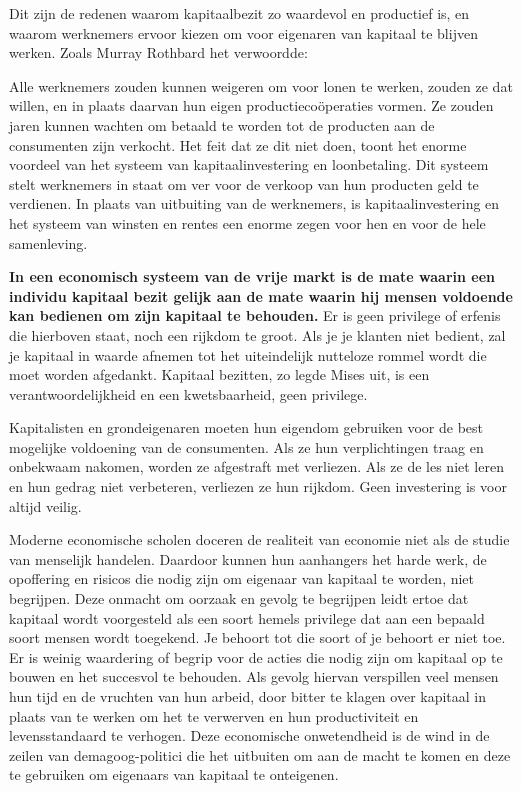 Dit zijn de redenen waarom kapitaalbezit zo waardevol en productief is, en waarom werknemers ervoor kiezen om voor eigenaren van kapitaal te blijven werken. Zoals Murray Rothbard het verwoordde:

\begin{blockquotebox}
    Alle werknemers zouden kunnen weigeren om voor lonen te werken, zouden ze dat willen, en in plaats daarvan hun eigen productiecoöperaties vormen. Ze zouden jaren kunnen wachten om betaald te worden tot de producten aan de consumenten zijn verkocht. Het feit dat ze dit niet doen, toont het enorme voordeel van het systeem van kapitaalinvestering en loonbetaling. Dit systeem stelt werknemers in staat om ver voor de verkoop van hun producten geld te verdienen. In plaats van uitbuiting van de werknemers, is kapitaalinvestering en het systeem van winsten en rentes een enorme zegen voor hen en voor de hele samenleving. \footnotemark
\end{blockquotebox}
\autocite{64}

\textbf{In een economisch systeem van de vrije markt is de mate waarin een individu kapitaal bezit gelijk aan de mate waarin hij mensen voldoende kan bedienen om zijn kapitaal te behouden.} Er is geen privilege of erfenis die hierboven staat, noch een rijkdom te groot. Als je je klanten niet bedient, zal je kapitaal in waarde afnemen tot het uiteindelijk nutteloze rommel wordt die moet worden afgedankt. Kapitaal bezitten, zo legde Mises uit, is een verantwoordelijkheid en een kwetsbaarheid, geen privilege.

\begin{blockquotebox}
    Kapitalisten en grondeigenaren moeten hun eigendom gebruiken voor de best mogelijke voldoening van de consumenten. Als ze hun verplichtingen traag en onbekwaam nakomen, worden ze afgestraft met verliezen. Als ze de les niet leren en hun gedrag niet verbeteren, verliezen ze hun rijkdom. Geen investering is voor altijd veilig. \footnotemark
\end{blockquotebox}
\autocite{65}

Moderne economische scholen doceren de realiteit van economie niet als de studie van menselijk handelen. Daardoor kunnen hun aanhangers het harde werk, de opoffering en risico\textquotesingle s die nodig zijn om eigenaar van kapitaal te worden, niet begrijpen. Deze onmacht om oorzaak en gevolg te begrijpen leidt ertoe dat kapitaal wordt voorgesteld als een soort hemels privilege dat aan een bepaald soort mensen wordt toegekend. Je behoort tot die soort of je behoort er niet toe. Er is weinig waardering of begrip voor de acties die nodig zijn om kapitaal op te bouwen en het succesvol te behouden. Als gevolg hiervan verspillen veel mensen hun tijd en de vruchten van hun arbeid, door bitter te klagen over kapitaal in plaats van te werken om het te verwerven en hun productiviteit en levensstandaard te verhogen. Deze economische onwetendheid is de wind in de zeilen van demagoog-politici die het uitbuiten om aan de macht te komen en deze te gebruiken om eigenaars van kapitaal te onteigenen.

